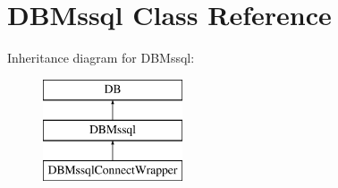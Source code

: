 \hypertarget{classDBMssql}{\section{D\+B\+Mssql Class Reference}
\label{classDBMssql}
}
Inheritance diagram for D\+B\+Mssql\+:\begin{figure}[H]
\begin{center}
\leavevmode
\includegraphics[height=3.000000cm]{classDBMssql}
\end{center}
\end{figure}

